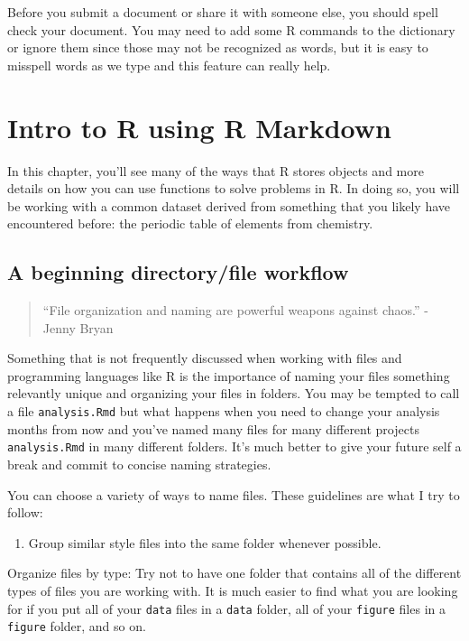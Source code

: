 \documentclass[]{tufte-book}
\providecommand{\tightlist}{%
  \setlength{\itemsep}{0pt}\setlength{\parskip}{0pt}}
\begin{document}
Before you submit a document or share it with someone else, you should spell check your document. You may need to add some R commands to the dictionary or ignore them since those may not be recognized as words, but it is easy to misspell words as we type and this feature can really help.

\chapter{Intro to R using R Markdown}\label{rmdanal}

In this chapter, you'll see many of the ways that R stores objects and more details on how you can use functions to solve problems in R. In doing so, you will be working with a common dataset derived from something that you likely have encountered before: the periodic table of elements from chemistry.

\section{A beginning directory/file workflow}\label{a-beginning-directoryfile-workflow}

\begin{quote}
``File organization and naming are powerful weapons against chaos.'' - Jenny Bryan
\end{quote}

Something that is not frequently discussed when working with files and programming languages like R is the importance of naming your files something relevantly unique and organizing your files in folders. You may be tempted to call a file \texttt{analysis.Rmd} but what happens when you need to change your analysis months from now and you've named many files for many different projects \texttt{analysis.Rmd} in many different folders. It's much better to give your future self a break and commit to concise naming strategies.

You can choose a variety of ways to name files. These guidelines are what I try to follow:

\begin{enumerate}
\def\labelenumi{\arabic{enumi}.}
\tightlist
\item
  Group similar style files into the same folder whenever possible.
\end{enumerate}

Organize files by type: Try not to have one folder that contains all of the
different types of files you are working with. It is much easier to find what you
are looking for if you put all of your \texttt{data} files in a \texttt{data} folder, all of
your \texttt{figure} files in a \texttt{figure} folder, and so on.
\end{document}
